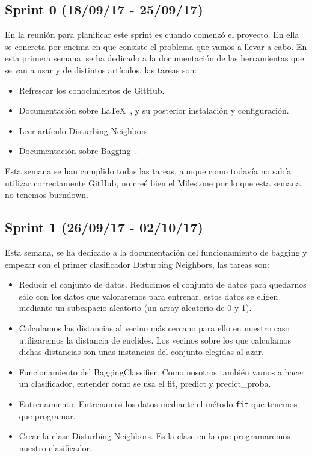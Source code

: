 \subsection{Sprint 0 (18/09/17 - 25/09/17)}
En la reunión para planificar este sprint es cuando comenzó el proyecto. En ella se concreta por encima en que consiste el problema que vamos a llevar a cabo.
En esta primera semana, se ha dedicado a la documentación de las herramientas que se van a usar y de distintos artículos, las tareas son:
\begin{itemize}
\item Refrescar los conocimientos de GitHub.
\item Documentación sobre \LaTeX~\cite{wiki:latex}, y su posterior instalación y configuración.
\item Leer artículo Disturbing Neighbors~\cite{disturbingneighbors}.
\item Documentación sobre Bagging~\cite{scikitlearn}.
\end{itemize}

Esta semana se han cumplido todas las tareas, aunque como todavía no sabía utilizar correctamente GitHub, no creé bien el Milestone por lo que esta semana no tenemos burndown.

\subsection{Sprint 1 (26/09/17 - 02/10/17)}
Esta semana, se ha dedicado a la documentación del funcionamiento de bagging y empezar con el primer clasificador Disturbing Neighbors, las tareas son:
\begin{itemize}
\item Reducir el conjunto de datos. Reducimos el conjunto de datos para quedarnos sólo con los datos que valoraremos para entrenar, estos datos se eligen mediante un subespacio aleatorio (un array aleatorio de 0 y 1).
\item Calculamos las distancias al vecino más cercano para ello en nuestro caso utilizaremos la distancia de euclides. Los vecinos sobre los que calculamos dichas distancias son unas instancias del conjunto elegidas al azar. 
\item Funcionamiento del BaggingClassifier. Como nosotros también vamos a hacer un clasificador, entender como se usa el fit, predict y precict\_proba.
\item Entrenamiento. Entrenamos los datos mediante el método \texttt{fit} que tenemos que programar.
\item Crear la clase Disturbing Neighbors. Es la clase en la que programaremos nuestro clasificador.
\end{itemize}

